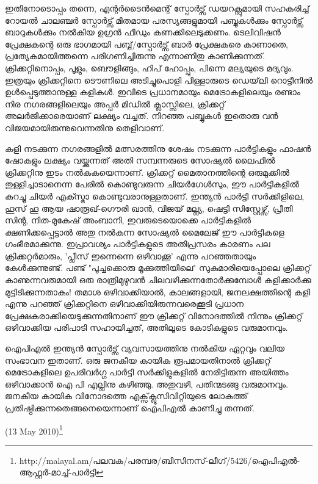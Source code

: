 ഇതിനോടൊപ്പം തന്നെ, എന്റര്‍ടൈന്‍മെന്റ് സ്പോര്‍ട്സ് ഡയറക്റ്റുമായി സഹകരിച്ച് റോയല്‍ ചാലഞ്ചര്‍ സ്പോര്‍ട്സ് 
മിതമായ പരസ്യങ്ങളുമായി പബ്ബുകള്‍ക്കും സ്പോര്‍ട്സ് ബാറുകള്‍ക്കും നല്‍കിയ ഉഗ്രന്‍ ഫീഡും കണക്കിലെടുക്കണം. 
ടെലിവിഷന്‍ പ്രേക്ഷകന്റെ ഒരു ഭാഗമായി പബ്ബ്/സ്പോര്‍ട്സ് ബാര്‍ പ്രേക്ഷകരെ കാണാതെ, പ്രത്യേകമായിത്തന്നെ 
പരിഗണിച്ചിരുന്നു എന്നാണിതു കാണിക്കുന്നത്. ക്രിക്കറ്റിനൊപ്പം, പൂളും, ബൌളിങ്ങും, ഹിപ് ഹോപ്പും, പിന്നെ മല്യയുടെ മദ്യവും. 
ഇത്രയും ക്രിക്കറ്റിനെ ടൌണിലെ അടിച്ചുപൊളി പിള്ളാരുടെ ഡെയ്‌ലി റൊട്ടീനില്‍ ഉള്‍പ്പെടുത്താനുള്ള കളികള്‍. ഇവിടെ 
പ്രധാനമായും മെട്രോകളിലെയും രണ്ടാം നിര നഗരങ്ങളിലെയും അപ്പര്‍ മിഡില്‍ ക്ലാസ്സിലെ, ക്രിക്കറ്റ് അലര്‍ജിക്കാരെയാണ് 
ലക്ഷ്യം വച്ചത്. നിറഞ്ഞ പബ്ബുകള്‍ ഇതൊരു വന്‍ വിജയമായിരുന്നുവെന്നതിനു തെളിവാണ്.


കളി നടക്കുന്ന നഗരങ്ങളില്‍ മത്സരത്തിനു ശേഷം നടക്കുന്ന പാര്‍ട്ടികളും ഫാഷന്‍ ഷോകളും ലക്ഷ്യം വയ്ക്കുന്നത് അതി 
സമ്പന്നരുടെ സോഷ്യല്‍ ലൈഫില്‍ ക്രിക്കറ്റിനു ഇടം നല്‍കുകയെന്നാണ്. ക്രിക്കറ്റ് മൈതാനത്തിന്റെ ഒരുമുക്കില്‍ 
തുള്ളിച്ചാടാനെന്ന പേരില്‍ കൊണ്ടുവരുന്ന ചിയര്‍ഗേള്‍സും, ഈ പാര്‍ട്ടികളില്‍ കുറച്ചു ചിയര്‍ എക്സ്ട്രാ കൊണ്ടുവരാനുള്ളതാണ്. 
ഇന്ത്യന്‍ പാര്‍ട്ടി സര്‍ക്കിളിലെ, ഹൂസ് ഹൂ ആയ ഷാരൂഖ്-ഗൌരി ഖാന്‍, വിജയ് മല്ല്യ, ഷെട്ടി സിസ്റ്റേഴ്സ്, പ്രീതി സിന്റ, 
നിത-മുകേഷ് അംബാനി, ഇവരുടെയൊക്കെ പാര്‍ട്ടികളില്‍ ക്ഷണിക്കപ്പെട്ടാല്‍ അതു നല്‍കുന്ന സോഷ്യല്‍ മൈലേജ് ഈ 
പാര്‍ട്ടികളെ ഗംഭീരമാക്കുന്നു. ഇപ്രാവശ്യം പാര്‍ട്ടികളുടെ അതിപ്രസരം കാരണം പല ക്രിക്കറ്റര്‍മാരും, 'പ്ലീസ് ഇന്നെന്നെ 
ഒഴിവാക്കൂ' എന്നു പറഞ്ഞതായും കേള്‍ക്കുന്നുണ്ട്. പണ്ട് "പൂച്ചക്കൊരു മൂക്കുത്തിയിലെ" സുകുമാരിയെപ്പോലെ ക്രിക്കറ്റ് 
കാണുന്നവരുമായി ഒരു രാത്രിമുഴുവന്‍ ചിലവഴിക്കുന്നതോര്‍ക്കുമ്പോള്‍ കളിക്കാര്‍ക്കു മുട്ടിടിക്കുന്നതാകും! തമാശ ഒഴിവാക്കിയാല്‍, 
കാലങ്ങളായി, ജനലക്ഷത്തിന്റെ കളി എന്നു പറഞ്ഞ് ക്രിക്കറ്റിനെ ഒഴിവാക്കിയിരുന്നവരെക്കൂടി പ്രധാന 
പ്രേക്ഷകരാക്കിയെടുക്കുന്നതിനാണ് ഈ ക്രിക്കറ്റ് വിനോദത്തില്‍ നിന്നും ക്രിക്കറ്റ് ഒഴിവാക്കിയ പരിപാടി സഹായിച്ചത്, 
അതിലൂടെ കോടികളുടെ വരുമാനവും.

ഐപിഎല്‍ ഇന്ത്യന്‍ സ്പോര്‍ട്സ് വ്യവസായത്തിനു നല്‍കിയ ഏറ്റവും വലിയ സംഭാവന ഇതാണ്. ഒരു ജനകീയ കായിക 
രൂപമായതിനാല്‍ ക്രിക്കറ്റ് മെട്രോകളിലെ ഉപരിവര്‍ഗ്ഗ പാര്‍ട്ടി സര്‍ക്കിളുകളില്‍ നേരിട്ടിരുന്ന അയിത്തം ഒഴിവാക്കാന്‍ 
ഐ പി എല്ലിനു കഴിഞ്ഞു. അതുവഴി, പതിന്മടങ്ങു വരുമാനവും. ജനകീയ കായിക വിനോദത്തെ എക്സ്‌ക്ലൂസിവിറ്റിയുടെ ലോകത്ത് 
പ്രതിഷ്ഠിക്കുന്നതെങ്ങനെയെന്നാണ് ഐപിഎല്‍ കാണിച്ചു തന്നത്.

(13 May 2010)\footnote{http://malayal.am/പലവക/പരമ്പര/ബിസിനസ്-ലീഗ്/5426/ഐപിഎല്‍-ആഫ്റ്റര്‍-മാച്ച്-പാര്‍ട്ടി}

\newpage
